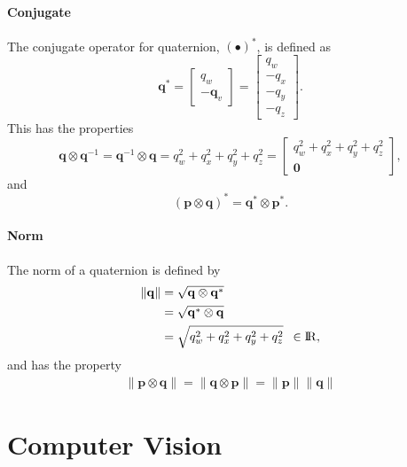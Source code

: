\documentclass{report}
\renewcommand{\Vec}[1]{{\mathbf{#1}}}
\newcommand{\real}{{\rm I\!R}}
\newcommand{\Norm}[1]{{\|#1\|}}
\newcommand{\quat}{{\Vec{q}}}
\begin{document}
\subsubsection{Conjugate}

The conjugate operator for quaternion, ${(\bullet)}^{\ast}$, is
defined as
%
\begin{equation}
  \quat^{\ast}
  =
  \begin{bmatrix}
    q_w \\
    - \Vec{q}_v
  \end{bmatrix}
  =
  \begin{bmatrix}
    q_w \\
    - q_x \\
    - q_y \\
    - q_z
  \end{bmatrix}.
\end{equation}
%
This has the properties
%
\begin{equation}
  \quat \otimes \quat^{-1}
  = \quat^{-1} \otimes \quat
  = q_{w}^{2} + q_{x}^{2} + q_{y}^{2} + q_{z}^{2}
  =
  \begin{bmatrix}
    q_{w}^{2} + q_{x}^{2} + q_{y}^{2} + q_{z}^{2} \\
    \Vec{0}
  \end{bmatrix},
\end{equation}
%
and
%
\begin{equation}
  (\Vec{p} \otimes \Vec{q})^{\ast}
  = \Vec{q}^{\ast} \otimes \Vec{p}^{\ast}.
\end{equation}


\subsubsection{Norm}

The norm of a quaternion is defined by
%
\begin{align}
  \Norm{\quat} &= \sqrt{\quat \otimes \quat^{\ast}} \\
    &= \sqrt{\quat^{\ast} \otimes \quat} \\
    &= \sqrt{q_{w}^{2} + q_{x}^{2} + q_{y}^{2} + q_{z}^{2}}
    \enspace \in \real,
\end{align}
%
and has the property
%
\begin{align}
  \Norm{\Vec{p} \otimes \Vec{q}} =
  \Norm{\Vec{q} \otimes \Vec{p}} =
  \Norm{\Vec{p}} \Norm{\Vec{q}}
\end{align}



\chapter{Computer Vision}
\end{document}
